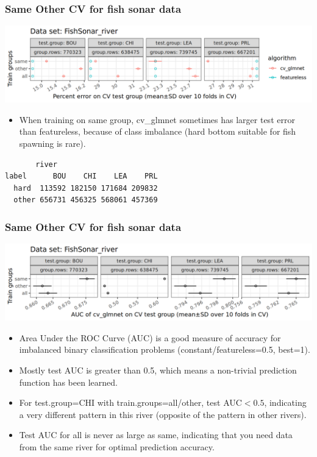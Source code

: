 \documentclass{beamer}
\begin{document}
\begin{frame}[fragile]
  \frametitle{Same Other CV for fish sonar data}
  \includegraphics[width=\textwidth]{FishSonar_river_error_glmnet_featureless_mean_SD.png}
  \begin{itemize}
  \item When training on same group, cv\_glmnet sometimes has larger
    test error than featureless, because of class imbalance (hard
    bottom suitable for fish spawning is rare).
  \end{itemize}
\begin{verbatim}
       river
label      BOU    CHI    LEA    PRL
  hard  113592 182150 171684 209832
  other 656731 456325 568061 457369
\end{verbatim}
\end{frame}

\begin{frame}
  \frametitle{Same Other CV for fish sonar data}
  \includegraphics[width=\textwidth]{FishSonar_river_AUC_glmnet_mean_SD.png}
  \begin{itemize}
  \item Area Under the ROC Curve (AUC) is a good measure of accuracy
    for imbalanced binary classification problems (constant/featureless=0.5, best=1).
  \item Mostly test AUC is greater than 0.5, which means a non-trivial
    prediction function has been learned.
  \item For test.group=CHI with train.groups=all/other, test
    AUC$<0.5$, indicating a very different pattern in this river
    (opposite of the pattern in other rivers).
  \item Test AUC for all is never as large as same, indicating that
    you need data from the same river for optimal prediction accuracy.
  \end{itemize}
\end{frame}
\end{document}
